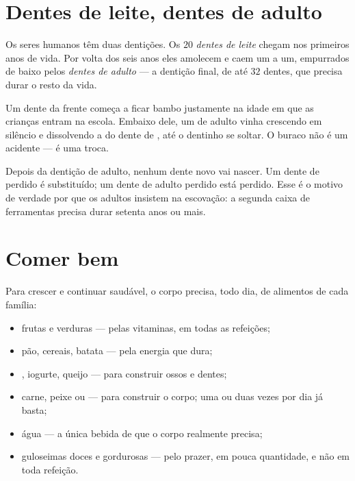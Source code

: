 \section{Dentes de leite, dentes de adulto}

\begin{proposition}\label{prop:g2:teeth-and-eating-well:sets}
Os seres humanos têm duas dentições. Os $20$ \emph{dentes de
leite} chegam nos primeiros anos de vida. Por
volta dos seis anos eles amolecem e caem um a um, empurrados de
baixo pelos \emph{dentes de adulto} --- a
dentição final, de até $32$ dentes, que precisa durar o resto da
vida.
\end{proposition}
\admitted

\begin{example}\label{ex:g2:teeth-and-eating-well:wobbly}
Um dente da frente começa a ficar bambo justamente na idade em que
as crianças entram na escola. Embaixo dele, um  de adulto
vinha crescendo em silêncio e dissolvendo a  do dente de ,
até o dentinho se soltar. O buraco não é um acidente --- é uma
troca.
\end{example}

\begin{remark}\label{rem:g2:teeth-and-eating-well:nothird}
Depois da dentição de adulto, nenhum dente novo vai nascer. Um dente
de  perdido é substituído; um dente de adulto perdido está
perdido. Esse é o motivo de verdade por que os adultos insistem na
escovação: a segunda caixa de ferramentas precisa durar setenta anos
ou mais.
\end{remark}

\section{Comer bem}

\begin{proposition}\label{prop:g2:teeth-and-eating-well:balanced}
Para crescer e continuar saudável, o corpo precisa, todo dia, de
alimentos de cada família:
\begin{itemize}
  \item frutas e verduras --- pelas vitaminas, em todas as refeições;
  \item pão, cereais, batata --- pela energia que dura;
  \item {}, iogurte, queijo --- para construir ossos e dentes;
  \item carne, peixe ou  --- para construir o corpo; uma ou duas
        vezes por dia já basta;
  \item água --- a única bebida de que o corpo realmente precisa;
  \item guloseimas doces e gordurosas --- pelo prazer, em pouca
        quantidade, e não em toda refeição.
\end{itemize}
\end{proposition}
\admitted

